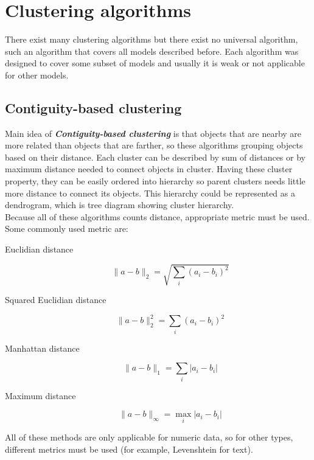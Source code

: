 \section{Clustering algorithms} \label{sec:clusteringAlgorithms}
There exist many clustering algorithms but there exist no universal algorithm, such an algorithm that covers all models described before. Each algorithm was designed to cover some subset of models and usually it is weak or not applicable for other models. 

\subsection{Contiguity-based clustering} \label{ssec:contiguityClustering}
Main idea of \textit{\textbf{Contiguity-based clustering}} is that objects that are nearby are more related than objects that are farther, so these algorithms grouping objects based on their distance. Each cluster can be described by sum of distances or by maximum distance needed to connect objects in cluster. Having these cluster property, they can be easily ordered into hierarchy so parent clusters needs little more distance to connect its objects. This hierarchy could be represented as a dendrogram, which is tree diagram showing cluster hierarchy.\\
Because all of these algorithms counts distance, appropriate metric must be used. Some commonly used   metric are:
\begin{description}
\item[Euclidian distance] $$\|a-b\|_2=\sqrt{\sum_i (a_i - b_i)^2 }$$
\item[Squared Euclidian distance] $$\|a-b\|_2^2=\sum_i (a_i - b_i)^2 $$
\item[Manhattan distance] $$\|a-b\|_1=\sum_i |a_i - b_i| $$
\item[Maximum distance] $$\|a-b\|_\infty=\max_i |a_i - b_i| $$
\end{description}
All of these methods are only applicable for numeric data, so for other types, different metrics must be used (for example, Levenshtein for text).

